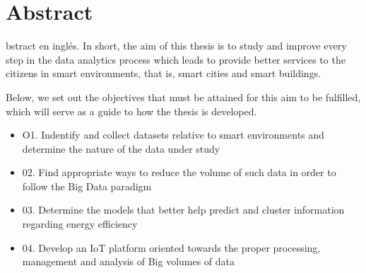 %
%
\let\textcircled=\pgftextcircled
{}
\chapter{Abstract}
\label{chap:abs}

bstract en inglés. In short, the aim of this thesis is to study and improve every step in the data analytics process which leads to provide better services to the citizens in smart environments, that is, smart cities and smart buildings.

Below, we set out the objectives that must be attained for this aim to be fulfilled, which will serve as a guide to how the thesis is developed.

\begin{itemize}

\item O1. Indentify and collect datasets relative to smart environments and determine the nature of the data under study
\item 02. Find appropriate ways to reduce the volume of such data in order to follow the Big Data paradigm
\item 03. Determine the models that better help predict and cluster information regarding energy efficiency
\item 04. Develop an IoT platform oriented towards the proper processing, management and analysis of Big volumes of data 

\end{itemize}